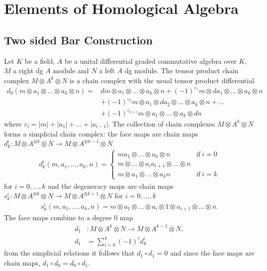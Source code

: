 \documentclass{scrartcl}
\theoremstyle{plain}
\theoremstyle{definition}
\renewcommand{\epsilon}{\varepsilon}
\newcommand{\abs}[1]{\left\lvert#1\right\rvert}
\newcommand{\comp}{\mathbin{\circ}}
\begin{document}
\section{Elements of Homological Algebra}

\subsection{Two sided Bar Construction}\label{subsec:bar_construction}
Let $K$ be a field, $A$ be a unital differential graded commutative algebra over $K$, $M$ a right dg $A$ module and $N$ a left $A$ dg module. The tensor product chain complex $M\otimes A^{k}\otimes N$ is a chain complex with the usual tensor product differential 
\begin{align*}
    d_0(m\otimes a_1\otimes \dots\otimes  a_k\otimes  n) = &dm\otimes a_1\otimes \dots\otimes a_k\otimes n+(-1)^{\epsilon_1}m\otimes da_1\otimes \dots\otimes a_k\otimes n\\&+(-1)^{\epsilon_2}m\otimes a_1\otimes da_2\otimes \dots\otimes a_k\otimes n + \dots \\&+ (-1)^{\epsilon_{k+1}}m\otimes a_1\otimes \dots\otimes a_k\otimes dn
\end{align*}
where $\epsilon_l = \abs{m}+\abs{a_1}+\dots+\abs{a_{l-1}}$. The collection of chain complexes $M\otimes A^k\otimes N$ forms a simplicial chain complex: the face maps are chain maps $d^i_k\colon M\otimes A^{\otimes k}\otimes N\to M\otimes A^{\otimes {k-1}}\otimes N$ 
\begin{align*}
    d^i_k(m, a_1, \dots, a_k, n) = \begin{cases}ma_1\otimes\dots\otimes a_k\otimes n & \text{if}\ i=0\\
    m\otimes \dots\otimes a_ia_{i+1}\otimes \dots\otimes n\\
    m\otimes a_1\otimes\dots\otimes a_k n & \text{if}\ i=k
\end{cases}
\end{align*}
for $i=0,\dots, k$ and the degeneracy maps are chain maps $s^i_k\colon M\otimes A^{\otimes k}\otimes N\to M\otimes A^{\otimes {k+1}}\otimes N$ for $i=0, \dots, k$
\begin{align*}
    s^i_k(m, a_1,\dots, a_k, n) = m\otimes a_1\otimes\dots\otimes a_i\otimes 1\otimes a_{i+1}\otimes\dots\otimes n.
\end{align*}
The face maps combine to a degree $0$ map
\begin{align*}
    d_1&\colon M\otimes A^{k}\otimes N\to M\otimes A^{k-1}\otimes N, \\
    d_1& = \sum_{i=0}^k (-1)^i d_k^i
\end{align*} 
 from the simplicial relations it follows that $d_1\comp d_1 = 0$ and since the face maps are chain maps, $d_1 \comp d_0 = d_0\comp d_1$. 
\end{document}
